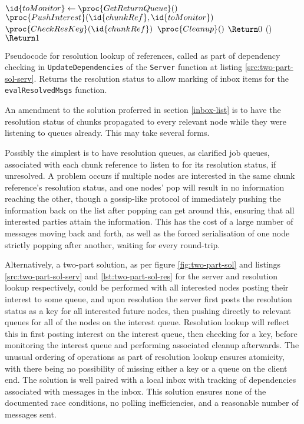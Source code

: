 \documentclass[a4paper,10pt]{article}
\begin{document}
\begin{srcclrs}
\begin{codebox}
	\li \(\id{toMonitor} \gets \proc{GetReturnQueue}()\)
	\li \(\proc{PushInterest}(\id{chunkRef}, \id{toMonitor})\)
	\li \If \(\proc{CheckResKey}(\id{chunkRef})\)
	\li \Then
	\(\proc{Cleanup}()\)
	\li \(\Return 0\)
	\li \Else
	()
	\li \(\Return 1\)
\end{codebox}
	\caption{\label{src:two-part-sol-res}Pseudocode for resolution lookup
	of references, called as part of dependency checking in
	\texttt{UpdateDependencies} of the \texttt{Server} function at listing
	\ref{src:two-part-sol-serv}. Returns the resolution status to allow
	marking of inbox items for the \texttt{evalResolvedMsgs} function.}
\end{srcclrs}

An amendment to the solution proferred in section \ref{inbox-list} is to have
the resolution status of chunks propagated to every relevant node while they
were listening to queues already.
This may take several forms.

Possibly the simplest is to have resolution queues, as clarified job queues,
associated with each chunk reference to listen to for its resolution status, if
unresolved.
A problem occurs if multiple nodes are interested in the same chunk reference's
resolution status, and one nodes' pop will result in no information reaching
the other, though a gossip-like protocol of immediately pushing the information
back on the list after popping can get around this, ensuring that all
interested parties attain the information.
This has the cost of a large number of messages moving back and forth, as well
as the forced serialisation of one node strictly popping after another, waiting
for every round-trip.

Alternatively, a two-part solution, as per figure \ref{fig:two-part-sol} and
listings \ref{src:two-part-sol-serv} and  \ref{lst:two-part-sol-res} for the
server and resolution lookup respectively, could be performed with all
interested nodes posting their interest to some queue, and upon resolution the
server first posts the resolution status as a key for all interested future
nodes, then pushing directly to relevant queues for all of the nodes on the
interest queue.
Resolution lookup will reflect this in first posting interest on the interest
queue, then checking for a key, before monitoring the interest queue and
performing associated cleanup afterwards.
The unusual ordering of operations as part of resolution lookup ensures
atomicity, with there being no possibility of missing either a key or a queue
on the client end.
The solution is well paired with a local inbox with tracking of dependencies
associated with messages in the inbox.
This solution ensures none of the documented race conditions, no polling
inefficiencies, and a reasonable number of messages sent.
\end{document}

